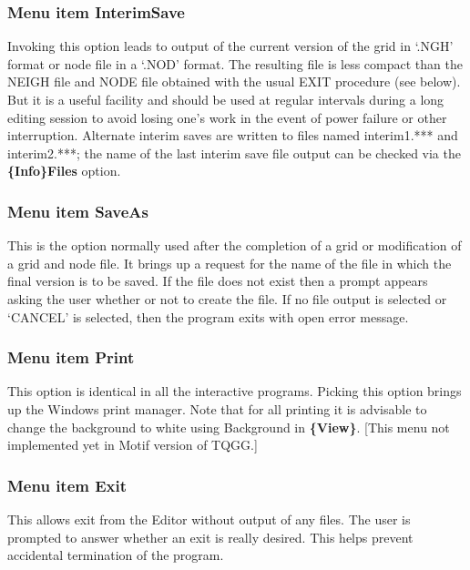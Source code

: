 \documentclass{article}
\begin{document}
\subsubsection[Menu item InterimSave]{Menu item InterimSave}
Invoking this option leads to output of the current version of the grid in `.NGH' format or node file in a `.NOD' format. The resulting file is less compact than the NEIGH file and NODE file obtained with the usual EXIT procedure (see below). But it is a useful facility and should be used at regular intervals during a long editing session to avoid losing one's work in the event of power failure or other interruption. Alternate interim saves are written to files named interim1.*** and interim2.***; the name of the last interim save file output can be checked via the \textbf{\{Info\}Files} option.

\subsubsection[Menu item SaveAs]{Menu item SaveAs}
This is the option normally used after the completion of a grid or modification of a grid and node file. It brings up a request for the name of the file in which the final version is to be saved. If the file does not exist then a prompt appears asking the user whether or not to create the file. If no file output is selected or `CANCEL' is selected, then the program exits with open error message.

\subsubsection[Menu item Print]{Menu item Print}
This option is identical in all the interactive programs. Picking this option brings up the Windows print manager. Note that for all printing it is advisable to change the background to white using Background in \textbf{\{View\}}. [This menu not implemented yet in Motif version of TQGG.]


\subsubsection[Menu item Exit]{Menu item Exit}
This allows exit from the Editor without output of any files. The user is prompted to answer whether an exit is really desired. This helps prevent accidental termination of the program.
\end{document}
